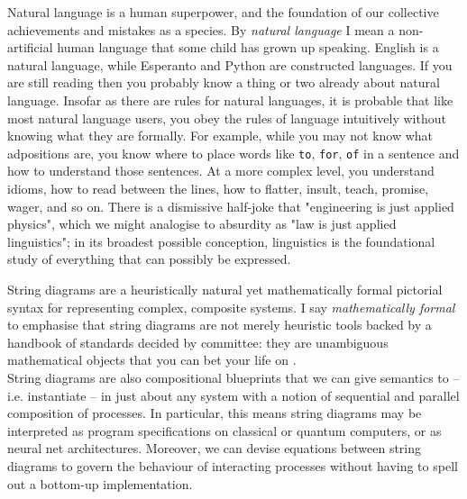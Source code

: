 Natural language is a human superpower, and the foundation of our collective achievements and mistakes as a species. By \emph{natural language} I mean a non-artificial human language that some child has grown up speaking. English is a natural language, while Esperanto and Python are constructed languages. If you are still reading then you probably know a thing or two already about natural language. Insofar as there are rules for natural languages, it is probable that like most natural language users, you obey the rules of language intuitively without knowing what they are formally. For example, while you may not know what adpositions are, you know where to place words like \texttt{to}, \texttt{for}, \texttt{of} in a sentence and how to understand those sentences. At a more complex level, you understand idioms, how to read between the lines, how to flatter, insult, teach, promise, wager, and so on. There is a dismissive half-joke that "engineering is just applied physics", which we might analogise to absurdity as "law is just applied linguistics"; in its broadest possible conception, linguistics is the foundational study of everything that can possibly be expressed.


String diagrams are a heuristically natural yet mathematically formal pictorial syntax for representing complex, composite systems. I say \emph{mathematically formal} to emphasise that string diagrams are not merely heuristic tools backed by a handbook of standards decided by committee: they are unambiguous mathematical objects that you can bet your life on \citep{joyalGeometryTensorCalculus1991c,joyalGEOMETRYTENSORCALCULUSa,maclaneNaturalAssociativityCommutativity1963,laneCategoriesWorkingMathematician2010,selingerSurveyGraphicalLanguages2010d}.\\

String diagrams are also compositional blueprints that we can give semantics to -- i.e. instantiate -- in just about any system with a notion of sequential and parallel composition of processes. In particular, this means string diagrams may be interpreted as program specifications on classical or quantum computers, or as neural net architectures. Moreover, we can devise equations between string diagrams to govern the behaviour of interacting processes without having to spell out a bottom-up implementation.\\


